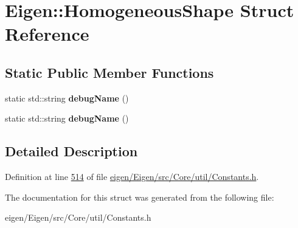 \hypertarget{struct_eigen_1_1_homogeneous_shape}{}\section{Eigen\+:\+:Homogeneous\+Shape Struct Reference}
\label{struct_eigen_1_1_homogeneous_shape}
\subsection*{Static Public Member Functions}
\begin{DoxyCompactItemize}
\item 
\mbox{\label{struct_eigen_1_1_homogeneous_shape_a101440de0501f7b21d2add1e311612a3}} 
static std\+::string {\bfseries debug\+Name} ()
\item 
\mbox{\label{struct_eigen_1_1_homogeneous_shape_a101440de0501f7b21d2add1e311612a3}} 
static std\+::string {\bfseries debug\+Name} ()
\end{DoxyCompactItemize}


\subsection{Detailed Description}


Definition at line \hyperlink{eigen_2_eigen_2src_2_core_2util_2_constants_8h_source_l00514}{514} of file \hyperlink{eigen_2_eigen_2src_2_core_2util_2_constants_8h_source}{eigen/\+Eigen/src/\+Core/util/\+Constants.\+h}.



The documentation for this struct was generated from the following file\+:\begin{DoxyCompactItemize}
\item 
eigen/\+Eigen/src/\+Core/util/\+Constants.\+h\end{DoxyCompactItemize}
